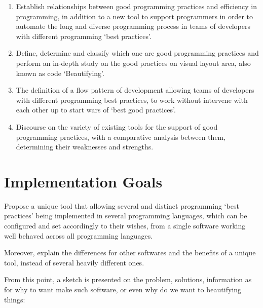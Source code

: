     \begin{enumerate}
        \item Establish relationships between good programming practices and efficiency in
              programming, in addition to a new tool to support programmers in order to
              automate the long and diverse programming process in teams of developers
              with different programming `best practices'.
        \item Define, determine and classify which one are good programming
              practices and perform an in-depth study on the good practices on visual
              layout area, also known as code `Beautifying'.
        \item The definition of a flow pattern of development allowing teams of
              developers with different programming best practices, to work without
              intervene with each other up to start wars of `best good practices'.
        \item Discourse on the variety of existing tools for the support of good
              programming practices, with a comparative analysis between them,
              determining their weaknesses and strengths.
    \end{enumerate}



    \section{Implementation Goals}

    Propose a unique tool that allowing several and distinct
    programming `best practices' being implemented in several programming
    languages, which can be configured and set accordingly to their wishes,
    from a single software working well behaved across all programming languages.

    Moreover, explain the differences for other softwares and the benefits
    of a unique tool, instead of several heavily different ones.

    From this point, a sketch is presented on the problem, solutions,
    information as for why to want make such software, or even why do we want to
    beautifying things:

